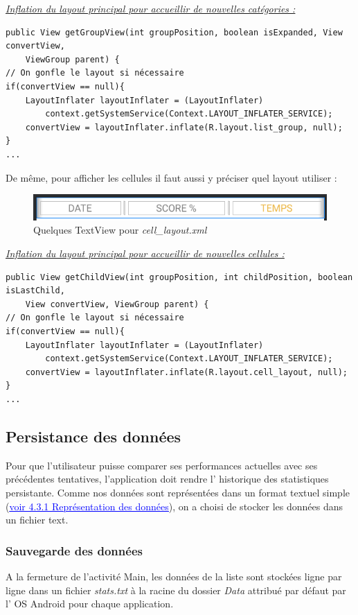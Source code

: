 \documentclass{article}
\begin{document}
\noindent\underline{\textit{Inflation du layout principal pour accueillir de nouvelles catégories :}}
\begin{verbatim}
public View getGroupView(int groupPosition, boolean isExpanded, View convertView, 
    ViewGroup parent) {
// On gonfle le layout si nécessaire
if(convertView == null){
    LayoutInflater layoutInflater = (LayoutInflater) 
        context.getSystemService(Context.LAYOUT_INFLATER_SERVICE);
    convertView = layoutInflater.inflate(R.layout.list_group, null);
}
...
\end{verbatim}
De même, pour afficher les cellules il faut aussi y préciser quel layout utiliser :

\begin{figure}[H]
    \centering
    \includegraphics[width=0.7\linewidth]{Ressources/androidCellLayout.png}
    \caption{Quelques TextView pour \textit{cell\_layout.xml}}
\end{figure}

\noindent\underline{\textit{Inflation du layout principal pour accueillir de nouvelles cellules :}}
\begin{verbatim}
public View getChildView(int groupPosition, int childPosition, boolean isLastChild, 
    View convertView, ViewGroup parent) {
// On gonfle le layout si nécessaire
if(convertView == null){
    LayoutInflater layoutInflater = (LayoutInflater) 
        context.getSystemService(Context.LAYOUT_INFLATER_SERVICE);
    convertView = layoutInflater.inflate(R.layout.cell_layout, null);
}
...
\end{verbatim}

\subsection{Persistance des données}
Pour que l'utilisateur puisse comparer ses performances actuelles avec ses précédentes tentatives, l'application doit rendre l' historique des statistiques persistante. Comme nos données sont représentées dans un format textuel simple (\hyperref[section:dataformat]{\textcolor{blue}{\underline{voir 4.3.1  Représentation des données}}}), on a choisi de stocker les données dans un fichier text.

\subsubsection{Sauvegarde des données}
A la fermeture de l'activité Main, les données de la liste sont stockées ligne par ligne dans un fichier \textit{stats.txt} à la racine du dossier \textit{Data} attribué par défaut par l' OS Android pour chaque application.\\
\end{document}
